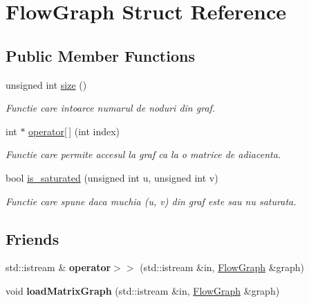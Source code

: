 \hypertarget{structFlowGraph}{
\section{FlowGraph Struct Reference}
\label{structFlowGraph}
}
\subsection*{Public Member Functions}
\begin{DoxyCompactItemize}
\item 
unsigned int \hyperlink{structFlowGraph_aeeae960e5ebc81157a250a0c6b48e15a}{size} ()
\begin{DoxyCompactList}\small\item\em Functie care intoarce numarul de noduri din graf. \item\end{DoxyCompactList}\item 
int $\ast$ \hyperlink{structFlowGraph_a19a2f24fbcbe9a11af5f8147426a4737}{operator\mbox{[}$\,$\mbox{]}} (int index)
\begin{DoxyCompactList}\small\item\em Functie care permite accesul la graf ca la o matrice de adiacenta. \item\end{DoxyCompactList}\item 
bool \hyperlink{structFlowGraph_ace838a5427a079d74ecd18428f5c63ea}{is\_\-saturated} (unsigned int u, unsigned int v)
\begin{DoxyCompactList}\small\item\em Functie care spune daca muchia (u, v) din graf este sau nu saturata. \item\end{DoxyCompactList}\end{DoxyCompactItemize}
\subsection*{Friends}
\begin{DoxyCompactItemize}
\item 
\hypertarget{structFlowGraph_aed8df937356e6365dcb435abb4de9a7f}{
std::istream \& {\bfseries operator$>$$>$} (std::istream \&in, \hyperlink{structFlowGraph}{FlowGraph} \&graph)}
\label{structFlowGraph_aed8df937356e6365dcb435abb4de9a7f}

\item 
\hypertarget{structFlowGraph_a2ea10c7cd0d5f40f2b3d36f4f67794e9}{
void {\bfseries loadMatrixGraph} (std::istream \&in, \hyperlink{structFlowGraph}{FlowGraph} \&graph)}
\label{structFlowGraph_a2ea10c7cd0d5f40f2b3d36f4f67794e9}

\end{DoxyCompactItemize}


